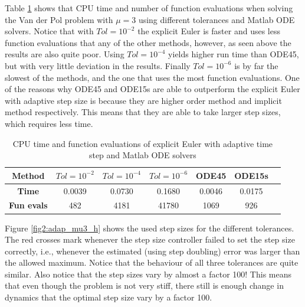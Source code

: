 Table \ref{tab2:mu3_adap} shows that CPU time and number of function evaluations when solving the Van der Pol problem with $\mu = 3$ using different tolerances and Matlab ODE solvers. Notice that with $Tol = 10^{-2}$ the explicit Euler is faster and uses less function evaluations that any of the other methods, however, as seen above the results are also quite poor. Using $Tol = 10^{-4}$ yields higher run time than ODE45, but with very little deviation in the results. Finally $Tol = 10^{-6}$ is by far the slowest of the methods, and the one that uses the most function evaluations. One of the reasons why ODE45 and ODE15s are able to outperform the explicit Euler with adaptive step size is because they are higher order method and implicit method respectively. This means that they are able to take larger step sizes, which requires less time.

\begin{table}[H]
    \centering
    \caption{CPU time and function evaluations of explicit Euler with adaptive time step and Matlab ODE solvers}
    \begin{tabular}{|c||c|c|c|c|c|c|} \hline
         \textbf{Method}    & $Tol = 10^{-2}$&   $Tol = 10^{-4}$ & $Tol = 10^{-6}$ & ODE45 & ODE15s     \\ \hline \hline 
         \textbf{Time}      & 0.0039  &  0.0730  &  0.1680 & 0.0046 & 0.0175   \\ \hline
         \textbf{Fun evals} & 482   & 4181 & 41780 & 1069 & 926  \\ \hline
    \end{tabular}
    \label{tab2:mu3_adap}
\end{table}

Figure \ref{fig2:adap_mu3_h} shows the used step sizes for the different tolerances. The red crosses mark whenever the step size controller failed to set the step size correctly, i.e., whenever the estimated (using step doubling) error was larger than the allowed maximum. Notice that the behaviour of all three tolerances are quite similar. Also notice that the step sizes vary by almost a factor 100! This means that even though the problem is not very stiff, there still is enough change in dynamics that the optimal step size vary by a factor 100. 

